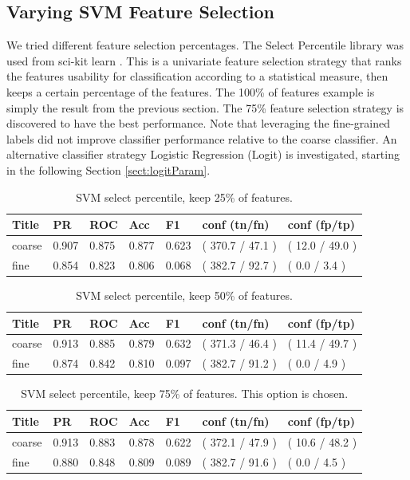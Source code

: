 \documentclass[ms]{nuthesis}
\begin{document}
\subsection{Varying SVM Feature Selection}
\par We tried different feature selection percentages. The Select Percentile library was used from
sci-kit learn \cite{scikit-learn}. This is a univariate feature selection strategy that ranks the
features usability for classification according to a statistical measure, then keeps a certain
percentage of the features. The 100\% of features example is simply the result from the previous
section. The 75\% feature selection strategy is discovered to have the best performance. Note
that leveraging the fine-grained labels did not improve classifier performance
relative to the coarse classifier. An alternative classifier strategy Logistic Regression
 (Logit) is investigated, starting in the following Section \ref{sect:logitParam}.

\FloatBarrier
\begin{table}[H]
\centering
\caption{SVM select percentile, keep 25\% of features.}
\label{tab:SVMSel25}
\begin{tabular}{|l||l||l||l||l||l||l|}\toprule
Title & PR & ROC & Acc & F1 & conf (tn/fn) & conf (fp/tp) \\ \midrule
coarse & 0.907 & 0.875 & 0.877 & 0.623 & ( 370.7 / 47.1 ) & ( 12.0 / 49.0 ) \\
fine & 0.854 & 0.823 & 0.806 & 0.068 & ( 382.7 / 92.7 ) & ( 0.0 / 3.4 ) \\ \bottomrule
\end{tabular}
\end{table}
\FloatBarrier


\FloatBarrier
\begin{table}[H]
\centering
\caption{SVM select percentile, keep 50\% of features.}
\label{tab:SVMSel50}
\begin{tabular}{|l||l||l||l||l||l||l|}\toprule
Title & PR & ROC & Acc & F1 & conf (tn/fn) & conf (fp/tp) \\ \midrule
coarse & 0.913 & 0.885 & 0.879 & 0.632 & ( 371.3 / 46.4 ) & ( 11.4 / 49.7 ) \\
fine & 0.874 & 0.842 & 0.810 & 0.097 & ( 382.7 / 91.2 ) & ( 0.0 / 4.9 ) \\ \bottomrule
\end{tabular}
\end{table}
\FloatBarrier



\FloatBarrier
\begin{table}[H]
\centering
\caption{SVM select percentile, keep 75\% of features. This option is chosen.}
\label{tab:SVMSel75}
\begin{tabular}{|l||l||l||l||l||l||l|}\toprule
Title & PR & ROC & Acc & F1 & conf (tn/fn) & conf (fp/tp) \\ \midrule
coarse & 0.913 & 0.883 & 0.878 & 0.622 & ( 372.1 / 47.9 ) & ( 10.6 / 48.2 ) \\
fine & 0.880 & 0.848 & 0.809 & 0.089 & ( 382.7 / 91.6 ) & ( 0.0 / 4.5 ) \\ \bottomrule
\end{tabular}
\end{table}
\FloatBarrier
\end{document}
